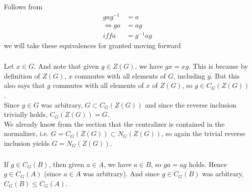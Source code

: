 \documentclass{article}
\newcommand{\inv}[1]{ {#1}^{-1} }
\begin{document}
\subsubsection{}\label{ex2p1}
Follows from 
\begin{align*}
ga\inv{g} &= a\\
\iff ga &= ag\\
iff a &= \inv{g}ag
\end{align*}
we will take these equivalences for granted moving forward
\subsubsection{}\label{ex2p2}
Let $x \in G$. And note that given $g \in Z(G)$, we have $gx=xg$. This is because by definition of $Z(G)$, $x$ commutes with all elements of $G$, including $g$. But this also says that $g$ commutes with all elements of $x$ of $Z(G)$, so $g \in C_G(Z(G))$.\\
Since $g\in G$ was arbitrary, $G \subset C_G(Z(G))$ and since the reverse inclusion trivially holds, $C_G(Z(G)) = G$.\\
We already know from the section that the centralizer is contained in the normalizer, i.e. $G = C_G(Z(G)) \subset N_G(Z(G))$, so again the trivial reverse inclusion yields $G = N_G(Z(G))$.
\subsubsection{}\label{ex2p3}
If $g \in C_G(B)$, then given $a\in A$, we have $a \in B$, so $ga=ag$ holds. Hence $g \in C_G(A)$ (since $a\in A$ was arbitrary). And since $g \in C_G(B)$ was arbitrary, $C_G(B) \leq C_G(A)$.
\end{document}
